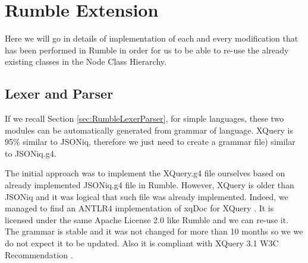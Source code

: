 \section{Rumble Extension}
Here we will go in details of implementation of each and every modification that has been performed in Rumble in order for us to be able to re-use the already existing classes in the Node Class Hierarchy. 

\subsection{Lexer and Parser}
If we recall Section \ref{sec:RumbleLexerParser}, for simple languages, these two modules can be automatically generated from grammar of language. XQuery is 95\% similar to JSONiq, therefore we just need to create a grammar file) similar to JSONiq.g4. 

The initial approach was to implement the XQuery.g4 file ourselves based on already implemented JSONiq.g4 file in Rumble. However, XQuery is older than JSONiq and it was logical that such file was already implemented. Indeed, we managed to find an ANTLR4 implementation of xqDoc for XQuery \cite{XqueryGrammar}. It is licensed under the same Apache License 2.0 like Rumble and we can re-use it. The grammar is stable and it was not changed for more than 10 months so we we do not expect it to be updated. Also it is compliant with XQuery 3.1 W3C Recommendation \cite{XQueryRecommendation}. 

